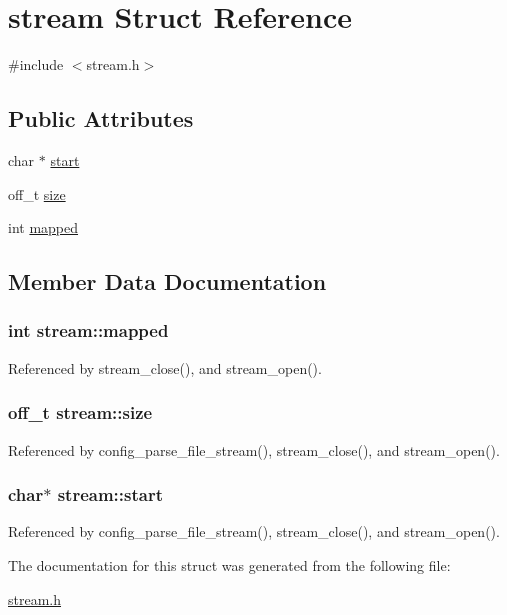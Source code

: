 \hypertarget{structstream}{\section{stream Struct Reference}
\label{structstream}
}


{\ttfamily \#include $<$stream.\-h$>$}

\subsection*{Public Attributes}
\begin{DoxyCompactItemize}
\item 
char $\ast$ \hyperlink{structstream_a13b8d8d685ea1d0923a4e9056b977f4f}{start}
\item 
off\-\_\-t \hyperlink{structstream_a4aacb994c9c8f3a1065672653d417927}{size}
\item 
int \hyperlink{structstream_add0039deace1b45e407cf1f08167c661}{mapped}
\end{DoxyCompactItemize}


\subsection{Member Data Documentation}
\hypertarget{structstream_add0039deace1b45e407cf1f08167c661}{
\subsubsection[{mapped}]{\setlength{\rightskip}{0pt plus 5cm}int stream\-::mapped}}\label{structstream_add0039deace1b45e407cf1f08167c661}


Referenced by stream\-\_\-close(), and stream\-\_\-open().

\hypertarget{structstream_a4aacb994c9c8f3a1065672653d417927}{
\subsubsection[{size}]{\setlength{\rightskip}{0pt plus 5cm}off\-\_\-t stream\-::size}}\label{structstream_a4aacb994c9c8f3a1065672653d417927}


Referenced by config\-\_\-parse\-\_\-file\-\_\-stream(), stream\-\_\-close(), and stream\-\_\-open().

\hypertarget{structstream_a13b8d8d685ea1d0923a4e9056b977f4f}{
\subsubsection[{start}]{\setlength{\rightskip}{0pt plus 5cm}char$\ast$ stream\-::start}}\label{structstream_a13b8d8d685ea1d0923a4e9056b977f4f}


Referenced by config\-\_\-parse\-\_\-file\-\_\-stream(), stream\-\_\-close(), and stream\-\_\-open().



The documentation for this struct was generated from the following file\-:\begin{DoxyCompactItemize}
\item 
\hyperlink{stream_8h}{stream.\-h}\end{DoxyCompactItemize}
